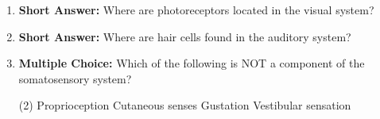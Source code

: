 \begin{enumerate}[label=\textbf{Q2.7.\arabic*}]

      \item \textbf{Short Answer:} Where are photoreceptors located in the visual system? \\
            
      \item \textbf{Short Answer:} Where are hair cells found in the auditory system? \\

      \item \textbf{Multiple Choice:} Which of the following is NOT a component of the somatosensory system?
            \begin{tasks}[label=\textcolor{\documentTheme}{(\Alph*)}, item-format=\color{\documentTheme}, label-width=1.5em, item-indent=1.7em](2)
                  \task Proprioception
                  \task Cutaneous senses
                  \task Gustation
                  \task Vestibular sensation
            \end{tasks}


\end{enumerate}
